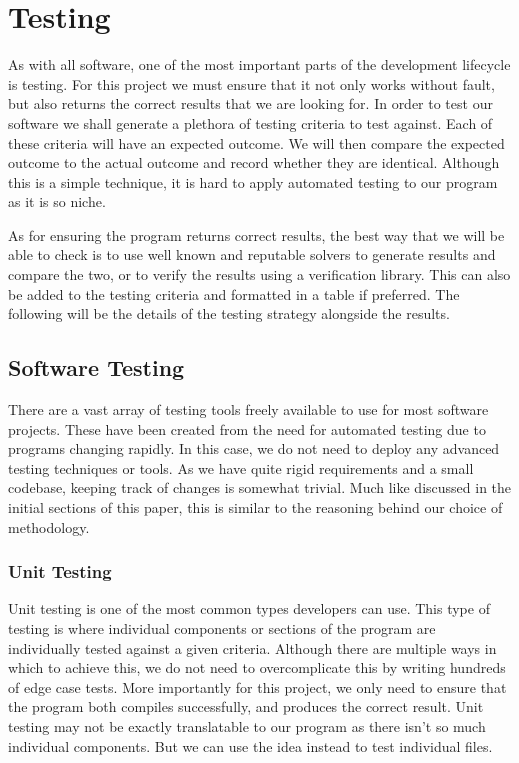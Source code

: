 \documentclass{article}
\begin{document}
\section{Testing}
As with all software, one of the most important parts of the development lifecycle is testing. For
this project we must ensure that it not only works without fault, but also returns the correct
results that we are looking for. In order to test our software we shall generate a plethora of
testing criteria to test against. Each of these criteria will have an expected outcome. We will then
compare the expected outcome to the actual outcome and record whether they are identical. Although
this is a simple technique, it is hard to apply automated testing to our program as it is so niche.

As for ensuring the program returns correct results, the best way that we will be able to check is
to use well known and reputable solvers to generate results and compare the two, or to verify the results using a verification
library. This can also be added to the testing criteria and formatted in a table if preferred. The following will be the
details of the testing strategy alongside the results.

\subsection{Software Testing}
There are a vast array of testing tools freely available to use for most software projects. These
have been created from the need for automated testing due to programs changing rapidly. In this
case, we do not need to deploy any advanced testing techniques or tools. As we have quite rigid
requirements and a small codebase, keeping track of changes is somewhat trivial. Much like discussed
in the initial sections of this paper, this is similar to the reasoning behind our choice of
methodology.

\subsubsection{Unit Testing}
Unit testing is one of the most common types developers can use. This type of testing is where individual components or sections
of the program are individually tested against a given criteria. Although there are multiple ways in which to achieve this, we do
not need to overcomplicate this by writing hundreds of edge case tests. More importantly for this project, we only need to ensure
that the program both compiles successfully, and produces the correct result. Unit testing may not be exactly translatable to our program as there isn't so much individual components. But we can use the idea instead to test individual files.
\end{document}
